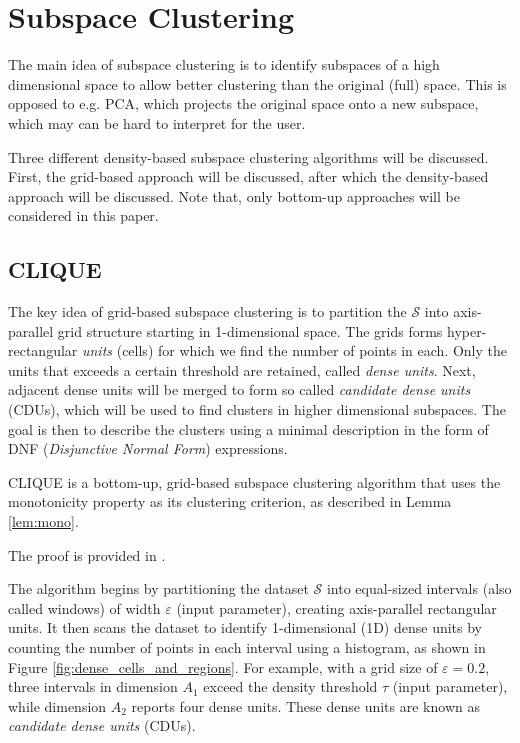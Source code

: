 \section{Subspace Clustering}
The main idea of subspace clustering is to identify subspaces of a high dimensional space to allow better clustering than the original (full) space. This is opposed to e.g. PCA, which projects the original space onto a new subspace, which may can be hard to interpret for the user.

Three different density-based subspace clustering algorithms will be discussed. First, the grid-based approach will be discussed, after which the density-based approach will be discussed. Note that, only bottom-up approaches will be considered in this paper.



\subsection{CLIQUE}
The key idea of grid-based subspace clustering is to partition the $\mathcal{S}$ into axis-parallel grid structure starting in 1-dimensional space. The grids forms hyper-rectangular \textit{units} (cells) for which we find the number of points in each. Only the units that exceeds a certain threshold are retained, called \textit{dense units}. Next, adjacent dense units will be merged to form so called \textit{candidate dense units} (CDUs), which will be used to find clusters in higher dimensional subspaces. The goal is then to describe the clusters using a minimal description in the form of DNF (\textit{Disjunctive Normal Form}) expressions.

CLIQUE is a bottom-up, grid-based subspace clustering algorithm that uses the monotonicity property as its clustering criterion, as described in Lemma \ref{lem:mono}.

The proof is provided in \cite{clique}.

The algorithm begins by partitioning the dataset $\mathcal{S}$ into equal-sized intervals (also called windows) of width $\varepsilon$ (input parameter), creating axis-parallel rectangular units. It then scans the dataset to identify 1-dimensional (1D) dense units by counting the number of points in each interval using a histogram, as shown in Figure \ref{fig:dense_cells_and_regions}. For example, with a grid size of $\varepsilon = 0.2$, three intervals in dimension $A_1$ exceed the density threshold $\tau$ (input parameter), while dimension $A_2$ reports four dense units. These dense units are known as \textit{candidate dense units} (CDUs).

